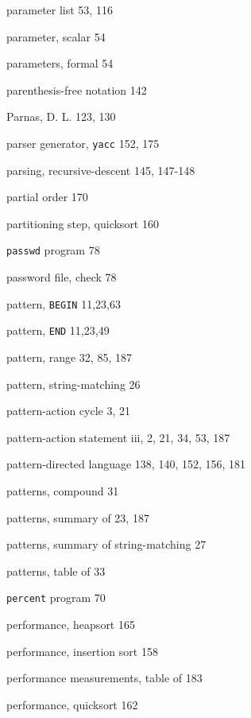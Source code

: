 \begin{multicols}{3}
\hangindent=3pc  parameter list 53, 116

\hangindent=3pc  parameter, scalar 54

\hangindent=3pc  parameters, formal 54

\hangindent=3pc  parenthesis-free notation 142

\hangindent=3pc  Parnas, D. L. 123, 130

\hangindent=3pc  parser generator, \verb'yacc' 152, 175

\hangindent=3pc  parsing, recursive-descent 145, 147-148

\hangindent=3pc  partial order 170

\hangindent=3pc  partitioning step, quicksort 160

\hangindent=3pc  \verb'passwd' program 78

\hangindent=3pc  password file, check 78

\hangindent=3pc  pattern, \verb'BEGIN' 11,23,63

\hangindent=3pc  pattern, \verb'END' 11,23,49

\hangindent=3pc  pattern, range 32, 85, 187

\hangindent=3pc  pattern, string-matching 26

\hangindent=3pc  pattern-action cycle 3, 21

\hangindent=3pc  pattern-action statement iii, 2, 21, 34, 53, 187

\hangindent=3pc  pattern-directed language 138,  140, 152, 156, 181

\hangindent=3pc  patterns, compound 31

\hangindent=3pc  patterns, summary of 23, 187

\hangindent=3pc  patterns, summary of string-matching 27

\hangindent=3pc  patterns, table of 33

\hangindent=3pc  \verb'percent' program 70

\hangindent=3pc  performance, heapsort 165

\hangindent=3pc  performance, insertion sort 158

\hangindent=3pc  performance measurements, table of 183

\hangindent=3pc  performance, quicksort 162


\end{multicols}

